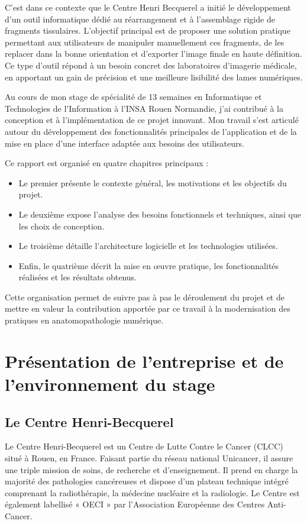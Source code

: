 \documentclass[12pt,a4paper]{report}
\begin{document}
C'est dans ce contexte que le Centre Henri Becquerel a initié le développement d'un outil informatique dédié au réarrangement et à l'assemblage rigide de fragments tissulaires. L'objectif principal est de proposer une solution pratique permettant aux utilisateurs de manipuler manuellement ces fragments, de les replacer dans la bonne orientation et d'exporter l'image finale en haute définition. Ce type d'outil répond à un besoin concret des laboratoires d'imagerie médicale, en apportant un gain de précision et une meilleure lisibilité des lames numériques.

Au cours de mon stage de spécialité de 13 semaines en Informatique et Technologies de l'Information à l'INSA Rouen Normandie, j'ai contribué à la conception et à l'implémentation de ce projet innovant. Mon travail s'est articulé autour du développement des fonctionnalités principales de l'application et de la mise en place d'une interface adaptée aux besoins des utilisateurs.

Ce rapport est organisé en quatre chapitres principaux :
\begin{itemize}
\item Le premier présente le contexte général, les motivations et les objectifs du projet.
\item Le deuxième expose l'analyse des besoins fonctionnels et techniques, ainsi que les choix de conception.
\item Le troisième détaille l'architecture logicielle et les technologies utilisées.
\item Enfin, le quatrième décrit la mise en œuvre pratique, les fonctionnalités réalisées et les résultats obtenus.
\end{itemize}

Cette organisation permet de suivre pas à pas le déroulement du projet et de mettre en valeur la contribution apportée par ce travail à la modernisation des pratiques en anatomopathologie numérique.

\chapter{Présentation de l'entreprise et de l'environnement du stage}

\section{Le Centre Henri-Becquerel}

Le Centre Henri-Becquerel est un Centre de Lutte Contre le Cancer (CLCC) situé à Rouen, en France. Faisant partie du réseau national Unicancer, il assure une triple mission de soins, de recherche et d'enseignement. Il prend en charge la majorité des pathologies cancéreuses et dispose d'un plateau technique intégré comprenant la radiothérapie, la médecine nucléaire et la radiologie. Le Centre est également labellisé « OECI » par l'Association Européenne des Centres Anti-Cancer.
\end{document}
